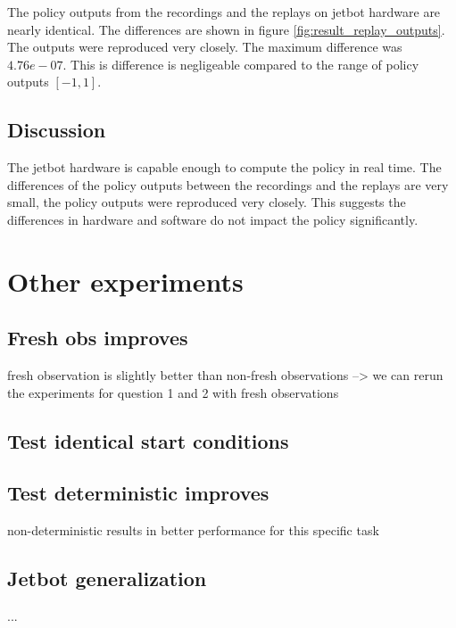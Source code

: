 The policy outputs from the recordings and the replays on jetbot hardware are nearly identical. The differences are shown in figure \ref{fig:result_replay_outputs}. The outputs were reproduced very closely. The maximum difference was $4.76e-07$.  This is difference is negligeable compared to the range of policy outputs $[-1,1]$.


\subsection{Discussion}

The jetbot hardware is capable enough to compute the policy in real time. The differences of the policy outputs between the recordings and the replays are very small, the policy outputs were reproduced very closely. This suggests the differences in hardware and software do not impact the policy significantly.


\section{Other experiments}

\subsection{Fresh obs improves}

fresh observation is slightly better than non-fresh observations
--> we can rerun the experiments for question 1 and 2 with fresh observations

\subsection{Test identical start conditions}


\subsection{Test deterministic improves}

non-deterministic results in better performance for this specific task


\subsection{Jetbot generalization}

...

